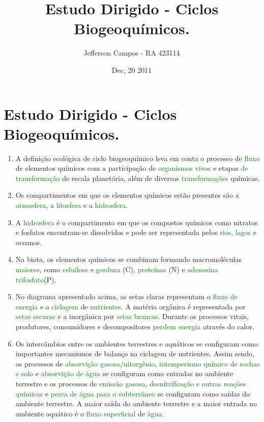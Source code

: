 \documentclass[a4paper,12pt]{article}
\title{Estudo Dirigido - Ciclos Biogeoquímicos.}
\author{Jefferson Campos - RA 423114}
\date{Dec, 20 2011}
\begin{document}
\maketitle
\newpage

\section{Estudo Dirigido - Ciclos Biogeoquímicos.}

\begin{enumerate}
\item A definição ecológica de ciclo biogeoquímico leva em conta o processo de \textcolor{green}{fluxo} de elementos químicos com a participação de \textcolor{green}{organismos} \textcolor{green}{vivos} e etapas \textcolor{green}{de transformação} de escala planetária, além de diversas \textcolor{green}{transformações} químicas.
\item Os compartimentos em que os elementos químicos estão presentes são a \textcolor{green}{atmosfera}, a \textcolor{green}{litosfera} e a \textcolor{green}{hidrosfera}.
\item A \textcolor{green}{hidrosfera} é o compartimento em que os compostos químicos como nitratos e fosfatos encontram-se dissolvidos e pode ser representada pelos \textcolor{green}{rios}, \textcolor{green}{lagos} e oceanos.
\item Na biota, os elementos químicos se combinam formando macromoléculas \textcolor{green}{maiores}, como \textcolor{green}{celuilose} e \textcolor{green}{gordura} (C), \textcolor{green}{proteínas} (N) e \textcolor{green}{adenosina} \textcolor{green}{trifosfato}(P).
\item No diagrama apresentado acima, as setas claras representam o \textcolor{green}{fluxo de energia} e a \textcolor{green}{ciclagem} de \textcolor{green}{nutrientes}. A matéria orgânica é representada por \textcolor{green}{setas escuras} e a inorgânica por \textcolor{green}{setas brancas}. Durante os processos vitais, produtores, consumidores e decompositores \textcolor{green}{perdem} \textcolor{green}{energia} através do calor.
\item Os intercâmbios entre os ambientes terrestres e aquáticos se configuram como importantes mecanismos de balanço na ciclagem de nutrientes. Assim sendo, os processos de \textcolor{green}{absorvição gasosa/nitorgênio}, \textcolor{green}{intemperismo químico de rochas e solo} e \textcolor{green}{absorvição de água} se configuram como entradas no ambiente terrestre e os processos de \textcolor{green}{emissão gasosa}, \textcolor{green}{desnitrificação e outras reações químicas} e \textcolor{green}{perca de água para o subterrâneo} se configuram como saídas do ambiente terrestre. A maior saída do ambiente terrestre e a maior entrada no ambiente aquático é o \textcolor{green}{fluxo superficial} de \textcolor{green}{água}.

\end{enumerate}
\end{document}
